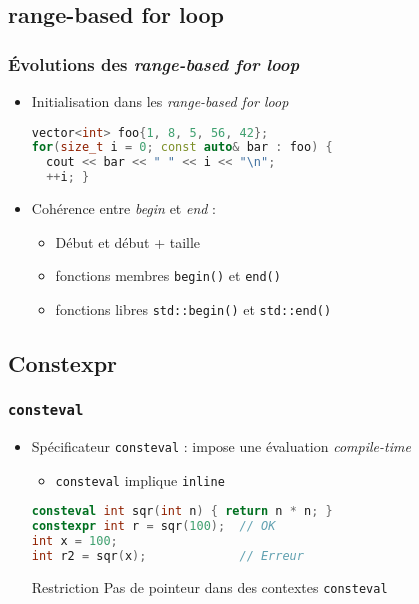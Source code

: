 \documentclass[C++.tex]{subfiles}
\begin{document}
\subsection*{range-based for loop}
\begin{frame}[fragile]
	\frametitle{Évolutions des \textit{range-based for loop}}
	\begin{itemize}
		\item Initialisation dans les \textit{range-based for loop}

		\begin{lstlisting}[language=C++]
vector<int> foo{1, 8, 5, 56, 42};
for(size_t i = 0; const auto& bar : foo) {
  cout << bar << " " << i << "\n";
  ++i; }\end{lstlisting}

		\item Cohérence entre \textit{begin} et \textit{end} :
		\begin{itemize}
			\item \og Début\fg{} et \og début + taille\fg{}
			\item fonctions membres \lstinline|begin()| et \lstinline|end()|
			\item fonctions libres \lstinline|std::begin()| et \lstinline|std::end()|
		\end{itemize}

	\end{itemize}
\end{frame}

\subsection*{Constexpr}
\begin{frame}[fragile]
	\frametitle{\lstinline|consteval|}
	\begin{itemize}
		\item Spécificateur \lstinline|consteval| : impose une évaluation \textit{compile-time}


		\begin{itemize}
			\item \lstinline|consteval| implique \lstinline|inline|
		\end{itemize}

		\begin{lstlisting}[language=C++]
consteval int sqr(int n) { return n * n; }
constexpr int r = sqr(100);  // OK
int x = 100;
int r2 = sqr(x);             // Erreur\end{lstlisting}

		\begin{alertblock}{Restriction}
			Pas de pointeur dans des contextes \lstinline|consteval|
		\end{alertblock}
	\end{itemize}
\end{frame}
\end{document}
